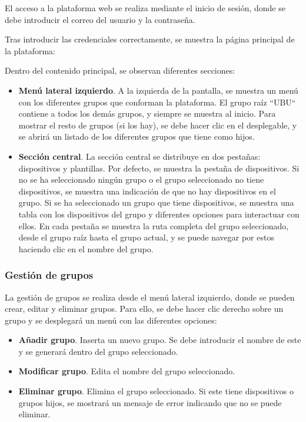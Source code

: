 El acceso a la plataforma web se realiza mediante el inicio de sesión, donde se debe introducir el correo del usuario
y la contraseña.

Tras introducir las credenciales correctamente, se muestra la página principal de la plataforma:


Dentro del contenido principal, se observan diferentes secciones:
\begin{itemize}
    \item \textbf{Menú lateral izquierdo}.
    A la izquierda de la pantalla, se muestra un menú con los diferentes grupos que conforman la plataforma.
    El grupo raíz ``UBU`` contiene a todos los demás grupos, y siempre se muestra al inicio.
    Para mostrar el resto de grupos (si los hay), se debe hacer clic en el desplegable, y se abrirá un listado de los diferentes
    grupos que tiene como hijos.
    \item \textbf{Sección central}.
    La sección central se distribuye en dos pestañas: dispositivos y plantillas.
    Por defecto, se muestra la pestaña de dispositivos.
    Si no se ha seleccionado ningún grupo o el grupo seleccionado no tiene dispositivos, se muestra una indicación de
    que no hay dispositivos en el grupo.
    Si se ha seleccionado un grupo que tiene dispositivos, se muestra una tabla con los dispositivos del grupo y
    diferentes opciones para interactuar con ellos.
    En cada pestaña se muestra la ruta completa del grupo seleccionado, desde el grupo raíz hasta el grupo actual, y
    se puede navegar por estos haciendo clic en el nombre del grupo.
\end{itemize}

\subsubsection{Gestión de grupos}

La gestión de grupos se realiza desde el menú lateral izquierdo, donde se pueden crear, editar y eliminar grupos.
Para ello, se debe hacer clic derecho sobre un grupo y se desplegará un menú con las diferentes opciones:


\begin{itemize}
    \item \textbf{Añadir grupo}.
    Inserta un nuevo grupo.
    Se debe introducir el nombre de este y se generará dentro del grupo seleccionado.
    \item \textbf{Modificar grupo}.
    Edita el nombre del grupo seleccionado.
    \item \textbf{Eliminar grupo}.
    Elimina el grupo seleccionado.
    Si este tiene dispositivos o grupos hijos, se mostrará un mensaje de error indicando que no se puede eliminar.
\end{itemize}

